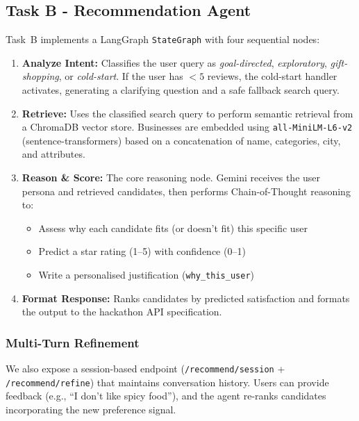 \documentclass[11pt, a4paper]{article}
\begin{document}
\subsection{Task B - Recommendation Agent}

Task~B implements a LangGraph \texttt{StateGraph} with four sequential nodes:

\begin{enumerate}[leftmargin=2em]
    \item \textbf{Analyze Intent:} Classifies the user query as \textit{goal-directed}, \textit{exploratory}, \textit{gift-shopping}, or \textit{cold-start}. If the user has $<5$ reviews, the cold-start handler activates, generating a clarifying question and a safe fallback search query.

    \item \textbf{Retrieve:} Uses the classified search query to perform semantic retrieval from a ChromaDB vector store. Businesses are embedded using \texttt{all-MiniLM-L6-v2} (sentence-transformers) based on a concatenation of name, categories, city, and attributes.

    \item \textbf{Reason \& Score:} The core reasoning node. Gemini receives the user persona and retrieved candidates, then performs Chain-of-Thought reasoning to:
    \begin{itemize}
        \item Assess why each candidate fits (or doesn't fit) this specific user
        \item Predict a star rating (1--5) with confidence (0--1)
        \item Write a personalised justification (\texttt{why\_this\_user})
    \end{itemize}

    \item \textbf{Format Response:} Ranks candidates by predicted satisfaction and formats the output to the hackathon API specification.
\end{enumerate}

\subsubsection{Multi-Turn Refinement}
We also expose a session-based endpoint (\texttt{/recommend/session} + \texttt{/recommend/refine}) that maintains conversation history. Users can provide feedback (e.g., ``I don't like spicy food''), and the agent re-ranks candidates incorporating the new preference signal.
\end{document}
